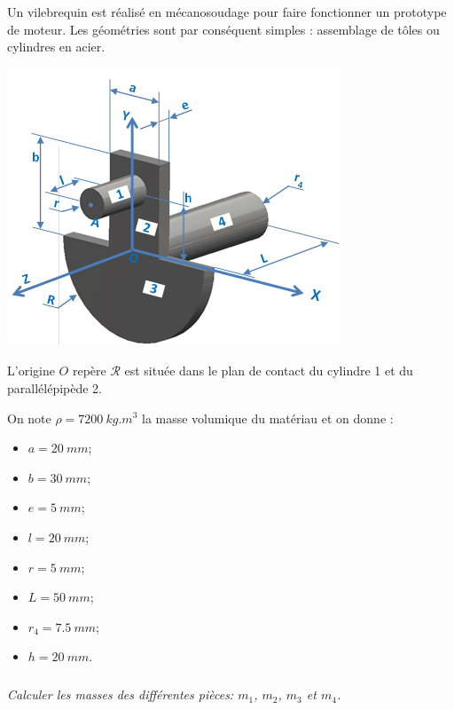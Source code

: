 \documentclass[10pt,fleqn]{article} %
\begin{document}
\def\pathfig{images}

\vspace{5cm}
\pagestyle{fancy}
\thispagestyle{plain}

\def\columnseprulecolor{\color{ocre}}
\setlength{\columnseprule}{0.4pt} 

\def\pathfig{images}

\ifprof
\else
\begin{multicols}{2}
\fi
Un vilebrequin est réalisé en mécanosoudage pour faire fonctionner un prototype de moteur. Les géométries sont par conséquent simples : assemblage de tôles ou cylindres en acier.

\begin{center}
\includegraphics[width=\linewidth]{images/fig_01}
\end{center}
L'origine $O$ repère $\mathcal{R}$ est située dans le plan de contact du cylindre 1 et du parallélépipède 2.

On note $\rho=\SI{7200}{kg.m^{3}}$ la masse volumique du matériau et on donne :
\begin{multicols}{2}
\begin{itemize}
\item $a = \SI{20}{mm}$;
\item $b = \SI{30}{mm}$;
\item $e = \SI{5}{mm}$;
\item $l = \SI{20}{mm}$;
\item $r = \SI{5}{mm}$;
\item $L = \SI{50}{mm}$;
\item $r_4 = \SI{7.5}{mm}$;
\item $h = \SI{20}{mm}$.
\end{itemize}
\end{multicols}
\subparagraph{}\textit{Calculer les masses des différentes pièces: $m_1$, $m_2$, $m_3$ et $m_4$.}


\end{multicols}
\end{document}
